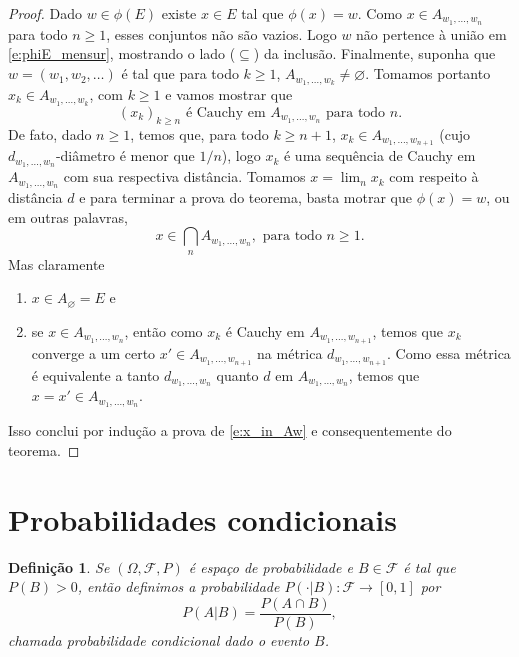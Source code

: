 \documentclass[reqno]{article}
\newcommand*\1{\mathds{1}}
\newtheorem{definition}[theorem]{Definição}
\newcommand{\mcap}{\textstyle \bigcap\limits}
\begin{document}
\begin{proof}
  Dado $w \in \phi(E)$ existe $x \in E$ tal que $\phi(x) = w$.
  Como $x \in A_{w_1, \dots, w_n}$ para todo $n \geq 1$, esses conjuntos não são vazios.
  Logo $w$ não pertence à união em \eqref{e:phiE_mensur}, mostrando o lado ($\subseteq$) da inclusão.
  Finalmente, suponha que $w = (w_1, w_2, \dots)$ é tal que para todo $k \geq 1$, $A_{w_1, \dots, w_k} \neq \varnothing$.
  Tomamos portanto $x_k \in A_{w_1, \dots, w_k}$, com $k \geq 1$ e vamos mostrar que 
  \begin{equation}
    \text{$(x_k)_{k \geq n}$ é Cauchy em $A_{w_1, \dots, w_n}$ para todo $n$.}
  \end{equation}
  De fato, dado $n \geq 1$, temos que, para todo $k \geq n + 1$, $x_k \in A_{w_1, \dots, w_{n+1}}$ (cujo $d_{w_1, \dots, w_{n}}$-diâmetro é menor que $1/n$), logo $x_k$ é uma sequência de Cauchy em $A_{w_1, \dots, w_n}$ com sua respectiva distância.
  Tomamos $x = \lim_n x_k$ com respeito à distância $d$ e para terminar a prova do teorema, basta motrar que $\phi(x) = w$, ou em outras palavras,
  \begin{equation}
    \label{e:x_in_Aw}
    x \in \mcap_n A_{w_1, \dots, w_n}, \text{ para todo $n \geq 1$.}
  \end{equation}
  Mas claramente
  \begin{enumerate}
  \item $x \in A_\varnothing = E$ e
  \item se $x \in A_{w_1, \dots, w_n}$, então como $x_k$ é Cauchy em $A_{w_1, \dots, w_{n+1}}$, temos que $x_k$ converge a um certo $x' \in A_{w_1, \dots, w_{n+1}}$ na métrica $d_{w_1, \dots, w_{n+1}}$.
    Como essa métrica é equivalente a tanto $d_{w_1, \dots, w_n}$ quanto $d$ em $A_{w_1, \dots, w_n}$, temos que $x = x' \in A_{w_1, \dots, w_n}$.
  \end{enumerate}
  Isso conclui por indução a prova de \eqref{e:x_in_Aw} e consequentemente do teorema.
\end{proof}

\newpage

\section{Probabilidades condicionais}

\begin{definition}
  Se $(\Omega, \mathcal{F}, P)$ é espaço de probabilidade e $B \in \mathcal{F}$ é tal que $P(B) > 0$, então definimos a probabilidade $P(\cdot | B): \mathcal{F} \to [0,1]$ por
  \begin{equation}
    \label{e:P_condicional}
    P(A | B) = \frac{P(A \cap B)}{P(B)},
  \end{equation}
  chamada probabilidade condicional dado o evento $B$.
\end{definition}
\end{document}
